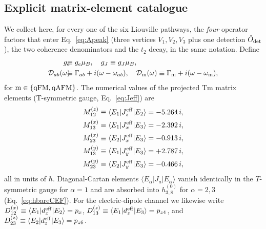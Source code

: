 \documentclass[reprint,amsmath,amssymb,aps,prb,longbibliography]{revtex4-2}
\begin{document}
\subsection{Explicit matrix-element catalogue}
\label{sec:MEcatalogue}

We collect here, for every one of the six Liouville pathways, the
\emph{four} operator factors that enter Eq.~\eqref{eq:Apeak} (three
vertices $V_1,V_2,V_3$ plus one detection $\hat O_{\rm det}$), the two
coherence denominators and the $t_2$ decay, in the same notation. Define
\begin{equation}
\begin{aligned}
g_e\!\!\!\!&\equiv g_e\mu_B,\quad g_J\equiv g_J\mu_B,\\
\mathcal D_{ab}(\omega)\!\!\!\!&\equiv \Gamma_{ab}+i(\omega-\omega_{ab}),\quad
\mathcal D_{\rm m}(\omega)\equiv \Gamma_{\rm m}+i(\omega-\omega_{\rm m}),
\end{aligned}
\label{eq:catalogueshorthand}
\end{equation}
for $\rm m\in\{qFM,qAFM\}$. The numerical values of the projected Tm
matrix elements (T-symmetric gauge, Eq.~\eqref{eq:Jeff}) are
\begin{equation}
\begin{aligned}
M_{12}^{(z)}&\equiv\langle E_1|J_z^{\rm eff}|E_2\rangle = -5.264\,i,\\
M_{13}^{(x)}&\equiv\langle E_1|J_x^{\rm eff}|E_3\rangle = -2.392\,i,\\
M_{23}^{(x)}&\equiv\langle E_2|J_x^{\rm eff}|E_3\rangle = -0.913\,i,\\
M_{13}^{(y)}&\equiv\langle E_1|J_y^{\rm eff}|E_3\rangle = +2.787\,i,\\
M_{23}^{(y)}&\equiv\langle E_2|J_y^{\rm eff}|E_3\rangle = -0.466\,i,
\end{aligned}
\label{eq:Mnumeric}
\end{equation}
all in units of $\hbar$. Diagonal-Cartan elements
$\langle E_\alpha|J_a|E_\alpha\rangle$ vanish identically in the
$T$-symmetric gauge for $\alpha=1$ and are absorbed into $h^{(0)}_{3,8}$
for $\alpha=2,3$ (Eq.~\eqref{eq:hbareCEF}).
For the electric-dipole channel we likewise write
$D_{12}^{(x)}\equiv\langle E_1|d_x^{\rm eff}|E_2\rangle=p_x$,
$D_{13}^{(z)}\equiv\langle E_1|d_z^{\rm eff}|E_3\rangle=p_{z4}$, and
$D_{23}^{(z)}\equiv\langle E_2|d_z^{\rm eff}|E_3\rangle=p_{z6}$.
\end{document}
